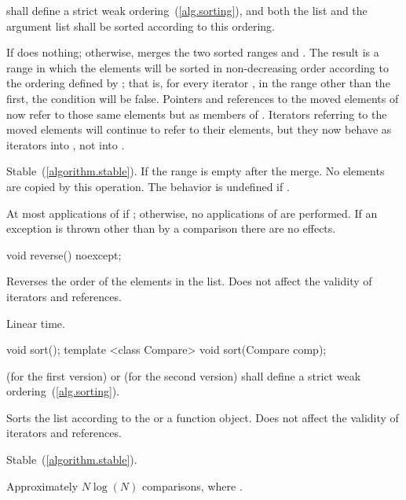 \begin{itemdescr}
\pnum
\requires
{} shall define a strict weak ordering~(\ref{alg.sorting}), and both the list and the argument list shall be
sorted according to this ordering.

\pnum
\effects
If  does nothing; otherwise, merges the two sorted ranges \tcode{[begin(),
end())} and \tcode{[x.\brk{}begin(), x.end())}. The result is a range in which the elements
will be sorted in non-decreasing order according to the ordering defined by ; that
is, for every iterator , in the range other than the first, the condition
 will be false.
Pointers and references to the moved elements of  now refer to those same elements
but as members of . Iterators referring to the moved elements will continue to
refer to their elements, but they now behave as iterators into , not into
.

\pnum
\remarks Stable~(\ref{algorithm.stable}). If  the range \tcode{[x.begin(), x.end())}
is empty after the merge.
No elements are copied by this operation. The behavior is undefined if
.

\pnum
\complexity
At most
applications of  if
;
otherwise, no applications of  are performed.
If an exception is thrown other than by a comparison there are no effects.
\end{itemdescr}

%
\begin{itemdecl}
void reverse() noexcept;
\end{itemdecl}

\begin{itemdescr}
\pnum
\effects
Reverses the order of the elements in the list.
Does not affect the validity of iterators and references.

\pnum
\complexity
Linear time.
\end{itemdescr}

%
\begin{itemdecl}
                         void sort();
template <class Compare> void sort(Compare comp);
\end{itemdecl}

\begin{itemdescr}
\pnum
\requires
{}
(for the first
version)
or
(for the second version)
shall define a strict weak ordering~(\ref{alg.sorting}).

\pnum
\effects
Sorts the list according to the  or a  function object.
Does not affect the validity of iterators and references.

\pnum
\remarks Stable~(\ref{algorithm.stable}).

\pnum
\complexity
Approximately
$N \log(N)$
comparisons, where
.
\end{itemdescr}

